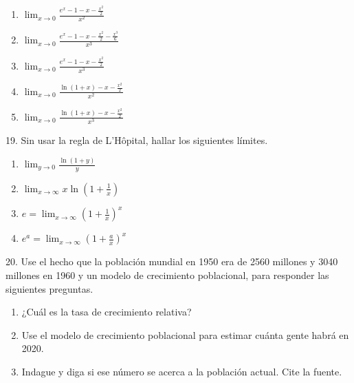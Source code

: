 \documentclass[12pt]{article}
\begin{document}
\begin{enumerate}[\hspace{9px} a)]
    \item \(\displaystyle\lim_{x \to 0}\frac{e^x-1-x-\frac{x^2}{2}}{x^2}\)

    \item \(\displaystyle\lim_{x \to 0}\frac{e^x-1-x-\frac{x^2}{2}-\frac{x^3}{6}}{x^3}\)

    \item \(\displaystyle\lim_{x \to 0}\frac{e^x-1-x-\frac{x^2}{2}}{x^3}\)

    \item \(\displaystyle\lim_{x \to 0}\frac{\ln(1+x)-x-\frac{x^2}{2}}{x^2}\)

    \item \(\displaystyle\lim_{x \to 0}\frac{\ln(1+x)-x-\frac{x^2}{2}}{x^3}\)

\end{enumerate}

19. Sin usar la regla de L'H\^opital, hallar los siguientes l\'imites.

\begin{enumerate}[\hspace{9px} a)]
    \item \(\displaystyle\lim_{y \to 0}\frac{\ln(1+y)}{y}\)

    \item \(\displaystyle\lim_{x \to \infty}x\ln\left(1+\frac{1}{x}\right)\)

    \item \(e=\displaystyle\lim_{x \to \infty}\left(1+\frac{1}{x}\right)^x\)

    \item \(e^a=\displaystyle\lim_{x \to \infty}\left(1+\frac{a}{x}\right)^x\)

\end{enumerate}

20. Use el hecho que la poblaci\'on mundial en 1950 era de 2560 millones y 3040 millones en 1960 y un modelo de crecimiento poblacional, para responder las siguientes preguntas.

\begin{enumerate}[\hspace{9px} a)]
    \item ¿Cuál es la tasa de crecimiento relativa?

    \item Use el modelo de crecimiento poblacional para estimar cuánta gente habrá en 2020.

    \item Indague y diga si ese número se acerca a la población actual. Cite la fuente.

\end{enumerate}
\end{document}
